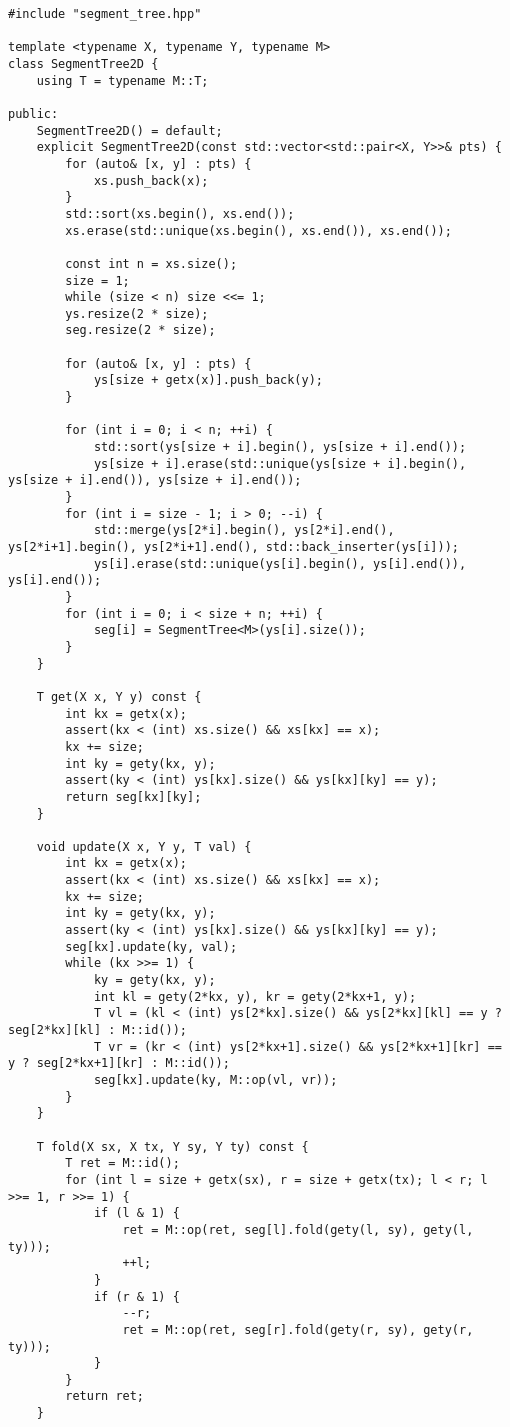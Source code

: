 \begin{lstlisting}
#include "segment_tree.hpp"

template <typename X, typename Y, typename M>
class SegmentTree2D {
    using T = typename M::T;

public:
    SegmentTree2D() = default;
    explicit SegmentTree2D(const std::vector<std::pair<X, Y>>& pts) {
        for (auto& [x, y] : pts) {
            xs.push_back(x);
        }
        std::sort(xs.begin(), xs.end());
        xs.erase(std::unique(xs.begin(), xs.end()), xs.end());

        const int n = xs.size();
        size = 1;
        while (size < n) size <<= 1;
        ys.resize(2 * size);
        seg.resize(2 * size);

        for (auto& [x, y] : pts) {
            ys[size + getx(x)].push_back(y);
        }

        for (int i = 0; i < n; ++i) {
            std::sort(ys[size + i].begin(), ys[size + i].end());
            ys[size + i].erase(std::unique(ys[size + i].begin(), ys[size + i].end()), ys[size + i].end());
        }
        for (int i = size - 1; i > 0; --i) {
            std::merge(ys[2*i].begin(), ys[2*i].end(), ys[2*i+1].begin(), ys[2*i+1].end(), std::back_inserter(ys[i]));
            ys[i].erase(std::unique(ys[i].begin(), ys[i].end()), ys[i].end());
        }
        for (int i = 0; i < size + n; ++i) {
            seg[i] = SegmentTree<M>(ys[i].size());
        }
    }

    T get(X x, Y y) const {
        int kx = getx(x);
        assert(kx < (int) xs.size() && xs[kx] == x);
        kx += size;
        int ky = gety(kx, y);
        assert(ky < (int) ys[kx].size() && ys[kx][ky] == y);
        return seg[kx][ky];
    }

    void update(X x, Y y, T val) {
        int kx = getx(x);
        assert(kx < (int) xs.size() && xs[kx] == x);
        kx += size;
        int ky = gety(kx, y);
        assert(ky < (int) ys[kx].size() && ys[kx][ky] == y);
        seg[kx].update(ky, val);
        while (kx >>= 1) {
            ky = gety(kx, y);
            int kl = gety(2*kx, y), kr = gety(2*kx+1, y);
            T vl = (kl < (int) ys[2*kx].size() && ys[2*kx][kl] == y ? seg[2*kx][kl] : M::id());
            T vr = (kr < (int) ys[2*kx+1].size() && ys[2*kx+1][kr] == y ? seg[2*kx+1][kr] : M::id());
            seg[kx].update(ky, M::op(vl, vr));
        }
    }

    T fold(X sx, X tx, Y sy, Y ty) const {
        T ret = M::id();
        for (int l = size + getx(sx), r = size + getx(tx); l < r; l >>= 1, r >>= 1) {
            if (l & 1) {
                ret = M::op(ret, seg[l].fold(gety(l, sy), gety(l, ty)));
                ++l;
            }
            if (r & 1) {
                --r;
                ret = M::op(ret, seg[r].fold(gety(r, sy), gety(r, ty)));
            }
        }
        return ret;
    }


\end{lstlisting}
